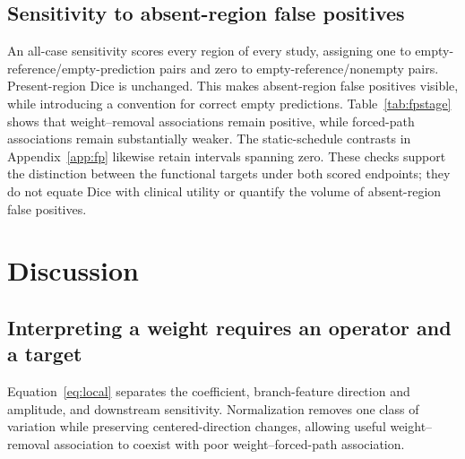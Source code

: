 \documentclass[mathematics,article,submit,pdftex,moreauthors]{Definitions/mdpi}
\begin{document}
\begin{table}[H]
\caption{Rebuilt supporting pooling comparison. Weight SD is the mean
over branches of the across-study population standard deviation. The
weight--drop column averages four branchwise Spearman correlations.
Winner agreement compares largest weight and highest forced-path
available-region Dice on each study.}
\label{tab:pooling}
\centering\small
\end{table}

\subsection{Sensitivity to absent-region false positives}
An all-case sensitivity scores every region of every study, assigning one
to empty-reference/empty-prediction pairs and zero to empty-reference/nonempty
pairs. Present-region Dice is unchanged. This makes absent-region false
positives visible, while introducing a convention for correct empty
predictions. Table~\ref{tab:fpstage} shows that weight--removal associations
remain positive, while forced-path associations remain substantially weaker.
The static-schedule contrasts in Appendix~\ref{app:fp} likewise retain
intervals spanning zero. These checks support the distinction between the
functional targets under both scored endpoints; they do not equate Dice
with clinical utility or quantify the volume of absent-region false positives.

\begin{table}[H]
\caption{Stage-level endpoint sensitivity. Spearman correlations use the
same twelve cells per fold as Table~\ref{tab:stage}.}
\label{tab:fpstage}
\centering\small
\end{table}

\section{Discussion}
\subsection{Interpreting a weight requires an operator and a target}
Equation~\eqref{eq:local} separates the coefficient, branch-feature direction
and amplitude, and downstream sensitivity. Normalization removes one class
of variation while preserving centered-direction changes, allowing useful
weight--removal association to coexist with poor weight--forced-path association.
\end{document}
